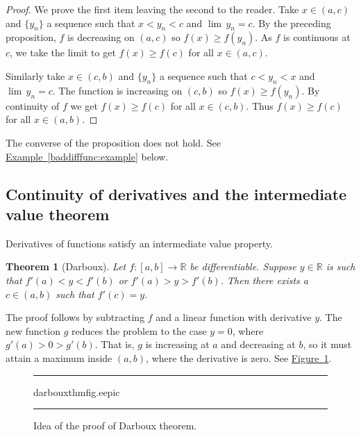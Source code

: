 \documentclass[12pt]{book}
\newenvironment{myfigureht}{%
\begin{figure}[h!t]
\noindent\rule{\textwidth}{0.4pt}\vspace{12pt}\par\centering}%
{\par\noindent\rule{\textwidth}{0.4pt}
\end{figure}}
\newcommand{\R}{{\mathbb{R}}}
\newcommand{\myindex}[1]{#1\index{#1}}
\theoremstyle{plain}
\newtheorem{thm}{Theorem}[section]
\theoremstyle{remark}
\theoremstyle{definition}
\theoremstyle{exercise}
\theoremstyle{example}
\newcommand{\figureref}[1]{\hyperref[#1]{Figure~\ref*{#1}}}
\newcommand{\exampleref}[1]{\hyperref[#1]{Example~\ref*{#1}}}
\begin{document}
\begin{proof}
We prove the first item leaving the second to the reader.
Take $x \in (a,c)$
and $\{ y_n\}$ a sequence such that $x < y_n < c$ and $\lim\, y_n = c$.
By the preceding proposition,
$f$ is decreasing on $(a,c)$ so $f(x) \geq f(y_n)$.
As $f$ is
continuous at $c$, we take the limit to get
$f(x) \geq f(c)$ for all $x \in (a,c)$.

Similarly take $x \in (c,b)$
and $\{ y_n\}$ a sequence such that $c < y_n < x$ and $\lim\, y_n = c$.
The function is increasing on $(c,b)$ so $f(x) \geq f(y_n)$.
By continuity of $f$ we get
$f(x) \geq f(c)$ for all $x \in (c,b)$.  Thus $f(x) \geq f(c)$ for all
$x \in (a,b)$.
\end{proof}

The converse of the proposition does not hold.  See
\exampleref{baddifffunc:example} below.

\subsection{Continuity of derivatives and the intermediate value theorem}

Derivatives of functions satisfy an
intermediate value property.

\begin{thm}[Darboux] \label{thm:darboux} 
Let $f \colon [a,b] \to \R$ be differentiable.  Suppose $y \in \R$ is such
that $f'(a) < y < f'(b)$ or
$f'(a) > y > f'(b)$.  Then there exists a $c \in (a,b)$ such that $f'(c) =
y$.
\end{thm}

The proof follows by subtracting $f$ and a linear function with derivative
$y$.  The new function $g$ reduces the problem
to the case $y=0$, where $g'(a) > 0 > g'(b)$.  That is, $g$ is increasing at $a$ and
decreasing at $b$, so it must attain a maximum inside $(a,b)$,
where the derivative is zero.  See \figureref{darbouxthmfig}.

\begin{myfigureht}
{darbouxthmfig.eepic}
\caption{Idea of the proof of Darboux theorem.\label{darbouxthmfig}}
\end{myfigureht}
\end{document}
